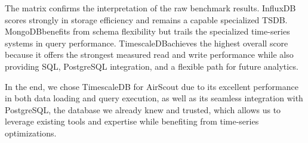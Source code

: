 \begin{table}[ht!]
    \centering
    \scriptsize
    \caption{Weighted decision matrix for selecting a time-series database for AirScout. Scores are project-specific and use a scale from 1 (poor fit) to 5 (excellent fit).}\label{tab:airscout-decision-matrix}
\end{table}

The matrix confirms the interpretation of the raw benchmark results. InfluxDB\@
scores strongly in storage efficiency and remains a capable specialized TSDB\@.
MongoDB\@ benefits from schema flexibility but trails the specialized
time-series systems in query performance. TimescaleDB\@ achieves the highest
overall score because it offers the strongest measured read and write
performance while also providing SQL, PostgreSQL integration, and a flexible
path for future analytics.

In the end, we chose TimescaleDB for AirScout due to its excellent performance
in both data loading and query execution, as well as its seamless integration
with PostgreSQL, the database we already knew and trusted, which allows us to
leverage existing tools and expertise while benefiting from time-series
optimizations.
